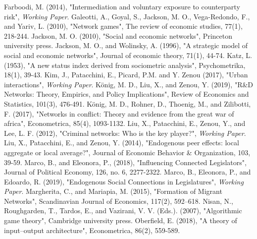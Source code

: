 \documentclass[12pt]{article}
\theoremstyle{definition}
\begin{document}
\begin{thebibliography}{99}
\bibitem{}
	Farboodi, M. (2014),
	"Intermediation and voluntary exposure to counterparty risk",
	\textit{Working Paper}.
\bibitem{}
	Galeotti, A., Goyal, S., Jackson, M. O., Vega-Redondo, F., and Yariv, L. (2010),
	"Network games",
	The review of economic studies, 77(1), 218-244.
	Jackson, M. O. (2010),
	"Social and economic networks",
	Princeton university press.
\bibitem{}
	Jackson, M. O., and Wolinsky, A. (1996),
	"A strategic model of social and economic networks",
	Journal of economic theory, 71(1), 44-74.
	Katz, L. (1953),
	"A new status index derived from sociometric analysis",
	Psychometrika, 18(1), 39-43.
	Kim, J., Patacchini, E., Picard, P.M. and Y. Zenou (2017),
	"Urban interactions",
	\textit{Working Paper}.
\bibitem{}
	K\"{o}nig, M. D., Liu, X., and Zenou, Y. (2019),
	"R\&D Networks: Theory, Empirics, and Policy Implications",
	Review of Economics and Statistics, 101(3), 476-491.
\bibitem{}
	K\"{o}nig, M. D., Rohner, D., Thoenig, M., and Zilibotti, F. (2017),
	"Networks in conflict: Theory and evidence from the great war of africa",
	Econometrica, 85(4), 1093-1132.
	Liu, X., Patacchini, E., Zenou, Y., and Lee, L. F. (2012),
	"Criminal networks: Who is the key player?",
	\textit{Working Paper}.
\bibitem{}
	Liu, X., Patacchini, E., and Zenou, Y. (2014),
	"Endogenous peer effects: local aggregate or local average?",
	Journal of Economic Behavior \& Organization, 103, 39-59.
\bibitem{}
	Marco, B., and Eleonora, P., (2018),
	"Influencing Connected Legislators",
	Journal of Political Economy, 126, no. 6, 2277-2322.
\bibitem{}
	Marco, B., Eleonora, P., and Edoardo, R. (2019),
	"Endogenous Social Connections in Legislatures",
	\textit{Working Paper}.
\bibitem{}
	Margherita, C., and Mariapia, M. (2015),
	"Formation of Migrant  Networks",
	Scandinavian Journal of Economics, 117(2), 592–618.
	Nisan, N., Roughgarden, T., Tardos, E., and Vazirani, V. V. (Eds.). (2007),
	"Algorithmic game theory",
	Cambridge university press.
\bibitem{}
	Oberfield, E. (2018),
	"A theory of input–output architecture",
	Econometrica, 86(2), 559-589.
\end{thebibliography}
\end{document}
